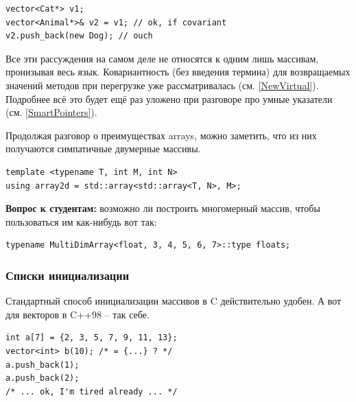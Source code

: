 \documentclass[a4paper,12pt,oneside]{article}
\newif\ifanswers
\begin{document}
\begin{lstlisting}
vector<Cat*> v1;
vector<Animal*>& v2 = v1; // ok, if covariant
v2.push_back(new Dog); // ouch
\end{lstlisting}

Все эти рассуждения на самом деле не относятся к одним лишь массивам, пронизывая весь язык. Ковариантность (без введения термина) для возвращаемых значений методов при перегрузке уже рассматривалась (см. \ref{NewVirtual}). Подробнее всё это будет ещё раз уложено при разговоре про умные указатели (см. \ref{SmartPointers}).

Продолжая разговор о преимуществах arrays, можно заметить, что из них получаются симпатичные двумерные массивы.

\begin{lstlisting}
template <typename T, int M, int N> 
using array2d = std::array<std::array<T, N>, M>; 
\end{lstlisting}

\textbf{Вопрос к студентам:} возможно ли построить многомерный массив, чтобы пользоваться им как-нибудь вот так:

\begin{lstlisting}
typename MultiDimArray<float, 3, 4, 5, 6, 7>::type floats;
\end{lstlisting}

\ifanswers
Правильный ответ: да и даже не так сложно

\begin{lstlisting}
template <class T, size_t I, size_t... J>
struct MultiDimArray 
{
  using Nested = typename MultiDimArray<T, J...>::type;
  using type = std::array<Nested, I>;
};
 
template <class T, size_t I>
struct MultiDimArray<T, I> 
{
  using type = std::array<T, I>;
};
\end{lstlisting}

К этому моменту курса это должно стать обычной задачей на вариабельные шаблоны.
\fi

\subsubsection{Списки инициализации}

Стандартный способ инициализации массивов в C действительно удобен. А вот для векторов в C++98 -- так себе.

\begin{lstlisting}
int a[7] = {2, 3, 5, 7, 9, 11, 13};
vector<int> b(10); /* = {...} ? */
a.push_back(1);
a.push_back(2);
/* ... ok, I'm tired already ... */
\end{lstlisting}
\end{document}
